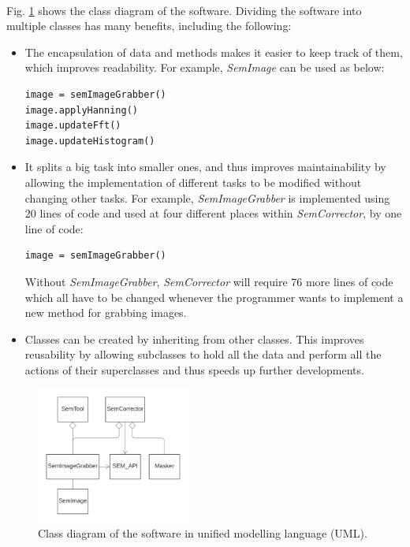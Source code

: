 \documentclass[12pt, twocolumn]{report}
\begin{document}
\paragraph{}
Fig. \ref{Software class diagram} shows the class diagram of the software. Dividing the software into multiple classes has many benefits, including the following:
\begin{itemize}
    \item The encapsulation of data and methods makes it easier to keep track of them, which improves readability. For example, \textit{SemImage} can be used as below:
    \begin{lstlisting}
image = semImageGrabber()
image.applyHanning()
image.updateFft()
image.updateHistogram()
    \end{lstlisting}
    \item It splits a big task into smaller ones, and thus improves maintainability by allowing the implementation of different tasks to be modified without changing other tasks. For example, \textit{SemImageGrabber} is implemented using 20 lines of code and used at four different places within \textit{SemCorrector}, by one line of code:
    \begin{lstlisting}
image = semImageGrabber()
    \end{lstlisting}
    Without \textit{SemImageGrabber}, \textit{SemCorrector} will require 76 more lines of code which all have to be changed whenever the programmer wants to implement a new method for grabbing images.
    \item Classes can be created by inheriting from other classes. This improves reusability by allowing subclasses to hold all the data and perform all the actions of their superclasses and thus speeds up further developments.
\end{itemize}

\begin{figure}[htbp]
    \centering
    \includegraphics[width=0.45\textwidth]{Figures/Software class diagram.png}
    \caption{Class diagram of the software in unified modelling language (UML).}
    \label{Software class diagram}
\end{figure}
\end{document}
